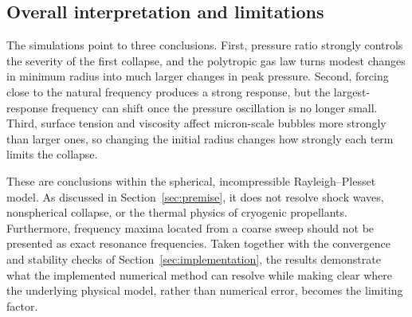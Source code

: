 \subsection{Overall interpretation and limitations}
\label{sec:results-summary}

The simulations point to three conclusions. First, pressure ratio strongly controls the severity of the first collapse, and the polytropic gas law turns modest changes in minimum radius into much larger changes in peak pressure. Second, forcing close to the natural frequency produces a strong response, but the largest-response frequency can shift once the pressure oscillation is no longer small. Third, surface tension and viscosity affect micron-scale bubbles more strongly than larger ones, so changing the initial radius changes how strongly each term limits the collapse.

These are conclusions within the spherical, incompressible Rayleigh--Plesset model. As discussed in Section~\ref{sec:premise}, it does not resolve shock waves, nonspherical collapse, or the thermal physics of cryogenic propellants. Furthermore, frequency maxima located from a coarse sweep should not be presented as exact resonance frequencies. Taken together with the convergence and stability checks of Section~\ref{sec:implementation}, the results demonstrate what the implemented numerical method can resolve while making clear where the underlying physical model, rather than numerical error, becomes the limiting factor.

